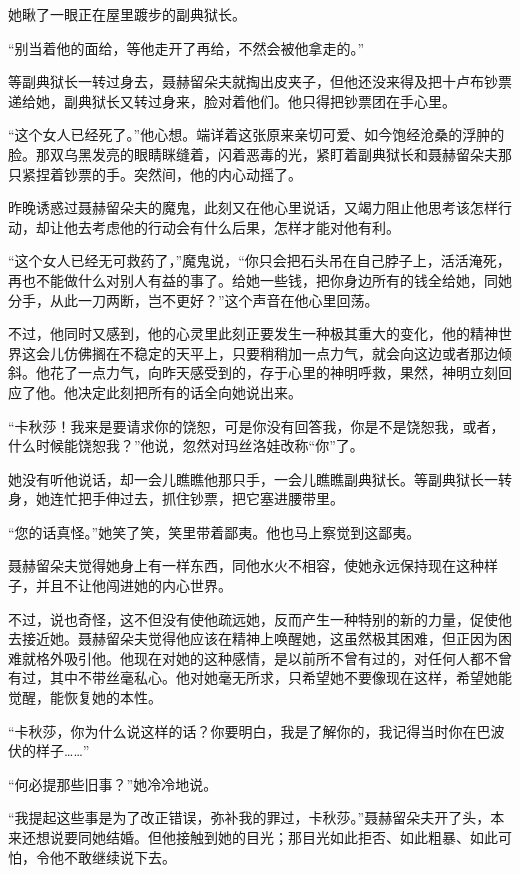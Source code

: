 \documentclass[12pt,UTF-8,openany]{ctexbook}
\begin{document}
\begin{normalsize}
    她瞅了一眼正在屋里踱步的副典狱长。
    
    “别当着他的面给，等他走开了再给，不然会被他拿走的。”
    
    等副典狱长一转过身去，聂赫留朵夫就掏出皮夹子，但他还没来得及把十卢布钞票递给她，副典狱长又转过身来，脸对着他们。他只得把钞票团在手心里。
    
    “这个女人已经死了。”他心想。端详着这张原来亲切可爱、如今饱经沧桑的浮肿的脸。那双乌黑发亮的眼睛眯缝着，闪着恶毒的光，紧盯着副典狱长和聂赫留朵夫那只紧捏着钞票的手。突然间，他的内心动摇了。
    
    昨晚诱惑过聂赫留朵夫的魔鬼，此刻又在他心里说话，又竭力阻止他思考该怎样行动，却让他去考虑他的行动会有什么后果，怎样才能对他有利。
    
    “这个女人已经无可救药了，”魔鬼说，“你只会把石头吊在自己脖子上，活活淹死，再也不能做什么对别人有益的事了。给她一些钱，把你身边所有的钱全给她，同她分手，从此一刀两断，岂不更好？”这个声音在他心里回荡。
    
    不过，他同时又感到，他的心灵里此刻正要发生一种极其重大的变化，他的精神世界这会儿仿佛搁在不稳定的天平上，只要稍稍加一点力气，就会向这边或者那边倾斜。他花了一点力气，向昨天感受到的，存于心里的神明呼救，果然，神明立刻回应了他。他决定此刻把所有的话全向她说出来。
    
    “卡秋莎！我来是要请求你的饶恕，可是你没有回答我，你是不是饶恕我，或者，什么时候能饶恕我？”他说，忽然对玛丝洛娃改称“你”了。
    
    她没有听他说话，却一会儿瞧瞧他那只手，一会儿瞧瞧副典狱长。等副典狱长一转身，她连忙把手伸过去，抓住钞票，把它塞进腰带里。
    
    “您的话真怪。”她笑了笑，笑里带着鄙夷。他也马上察觉到这鄙夷。
    
    聂赫留朵夫觉得她身上有一样东西，同他水火不相容，使她永远保持现在这种样子，并且不让他闯进她的内心世界。
    
    不过，说也奇怪，这不但没有使他疏远她，反而产生一种特别的新的力量，促使他去接近她。聂赫留朵夫觉得他应该在精神上唤醒她，这虽然极其困难，但正因为困难就格外吸引他。他现在对她的这种感情，是以前所不曾有过的，对任何人都不曾有过，其中不带丝毫私心。他对她毫无所求，只希望她不要像现在这样，希望她能觉醒，能恢复她的本性。
    
    “卡秋莎，你为什么说这样的话？你要明白，我是了解你的，我记得当时你在巴波伏的样子……”
    
    “何必提那些旧事？”她冷冷地说。
    
    “我提起这些事是为了改正错误，弥补我的罪过，卡秋莎。”聂赫留朵夫开了头，本来还想说要同她结婚。但他接触到她的目光；那目光如此拒否、如此粗暴、如此可怕，令他不敢继续说下去。
    

\end{normalsize}
\end{document}
